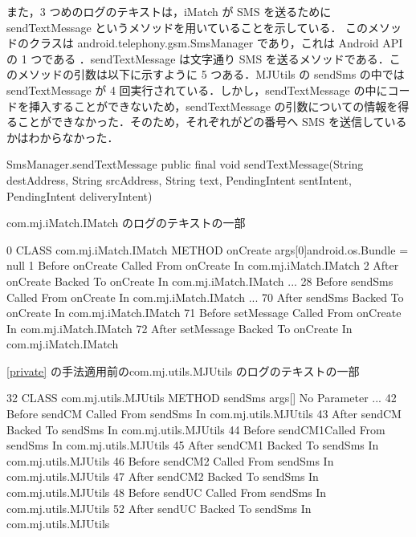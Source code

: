 また，3 つめのログのテキストは，iMatch が SMS を送るために sendTextMessage というメソッドを用いていることを示している．
このメソッドのクラスは android.telephony.gsm.SmsManager であり，これは Android API の 1 つである \cite{smsmanager}．sendTextMessage は文字通り SMS を送るメソッドである．このメソッドの引数は以下に示すように 5 つある．MJUtils の sendSms の中では sendTextMessage が 4 回実行されている．しかし，sendTextMessage の中にコードを挿入することができないため，sendTextMessage の引数についての情報を得ることができなかった．そのため，それぞれがどの番号へ SMS を送信しているかはわからなかった．

\begin{itembox}[c]{SmsManager.sendTextMessage}
public final void sendTextMessage(String destAddress, String srcAddress, String text, PendingIntent sentIntent, PendingIntent deliveryIntent)
\end{itembox}


\begin{itembox}[c]{com.mj.iMatch.IMatch のログのテキストの一部}
\footnotesize{
\begin{verbatimtab}[4]
0  CLASS com.mj.iMatch.IMatch METHOD onCreate args[0]android.os.Bundle = null
1    Before onCreate Called From onCreate In com.mj.iMatch.IMatch
2    After onCreate Backed To onCreate In com.mj.iMatch.IMatch
...
28    Before sendSms Called From onCreate In com.mj.iMatch.IMatch
...
70    After sendSms Backed To  onCreate In com.mj.iMatch.IMatch
71    Before setMessage Called From onCreate In com.mj.iMatch.IMatch
72    After setMessage Backed To  onCreate In com.mj.iMatch.IMatch
\end{verbatimtab}
}
\end{itembox}

\begin{itembox}[c]{\ref{private} の手法適用前のcom.mj.utils.MJUtils のログのテキストの一部}
\footnotesize{
\begin{verbatimtab}[4]
32 CLASS com.mj.utils.MJUtils METHOD sendSms args[] No Parameter
...
42	 Before sendCM Called From sendSms In com.mj.utils.MJUtils
43	 After sendCM Backed To  sendSms In com.mj.utils.MJUtils
44	 Before sendCM1Called From sendSms In com.mj.utils.MJUtils
45	 After sendCM1 Backed To  sendSms In com.mj.utils.MJUtils
46	 Before sendCM2 Called From sendSms In com.mj.utils.MJUtils
47	 After sendCM2 Backed To  sendSms In com.mj.utils.MJUtils
48	 Before sendUC Called From sendSms In com.mj.utils.MJUtils
52	 After sendUC Backed To  sendSms In com.mj.utils.MJUtils
\end{verbatimtab}
}
\end{itembox}


